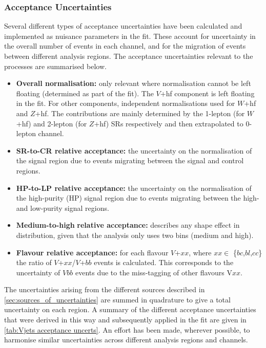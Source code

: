 






\subsubsection{Acceptance Uncertainties}

Several different types of acceptance uncertainties have been calculated and implemented as nuisance parameters in the fit.
These account for uncertainty in the overall number of events in each channel, and for the migration of events between different analysis regions.
The acceptance uncertainties relevant to the \Vjets processes are summarised below.
%
\begin{itemize}
    \item \textbf{Overall normalisation:} only relevant where normalisation cannot be left floating (determined as part of the fit). The $V$+hf component is left floating in the fit. For other components, independent normalisations used for $W$+hf and $Z$+hf. The contributions are mainly determined by the 1-lepton (for $W$+hf) and 2-lepton (for $Z$+hf) SRs respectively and then extrapolated to 0-lepton channel.
    \item \textbf{SR-to-CR relative acceptance:} the uncertainty on the normalisation of the signal region due to events migrating between the signal and control regions.
    \item \textbf{HP-to-LP relative acceptance:} the uncertainty on the normalisation of the high-purity (HP) signal region due to events migrating between the high- and low-purity signal regions.
    \item \textbf{Medium-to-high} \pTV \textbf{relative acceptance:} describes any shape effect in \pTV distribution, given that the analysis only uses two \pTV bins (medium and high).
    \item \textbf{Flavour relative acceptance:} for each flavour $V$+$xx$, where $xx\in$ \{$bc$,$bl$,$cc$\} the ratio of $V$+$xx$/$V$+$bb$ events is calculated. This corresponds to the uncertainty of $Vbb$ events due to the miss-tagging of other flavours V$xx$.
\end{itemize}
%
The uncertainties arising from the different sources described in \cref{sec:sources_of_uncertainties} are summed in quadrature to give a total uncertainty on each region.
A summary of the different acceptance uncertainties that were derived in this way and subsequently applied in the fit are given in \cref{tab:Vjets acceptance uncerts}.
An effort has been made, wherever possible, to harmonise similar uncertainties across different analysis regions and channels.

